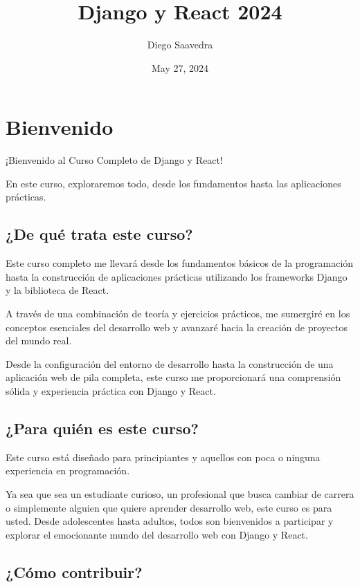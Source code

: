 \documentclass[
  a4paper,
  DIV=11,
  numbers=noendperiod,
  onepage,
  openany]{scrreprt}
\title{Django y React 2024}
\author{Diego Saavedra}
\date{May 27, 2024}
\renewcommand*\contentsname{Table of contents}
\newcommand\contentsname{Table of contents}
\begin{document}
\maketitle

\renewcommand*\contentsname{Table of contents}
{
\hypersetup{linkcolor=}
\setcounter{tocdepth}{2}
\tableofcontents
}

\chapter{Bienvenido}\label{bienvenido}

¡Bienvenido al Curso Completo de Django y React!

En este curso, exploraremos todo, desde los fundamentos hasta las
aplicaciones prácticas.

\section{¿De qué trata este curso?}\label{de-quuxe9-trata-este-curso}

Este curso completo me llevará desde los fundamentos básicos de la
programación hasta la construcción de aplicaciones prácticas utilizando
los frameworks Django y la biblioteca de React.

A través de una combinación de teoría y ejercicios prácticos, me
sumergiré en los conceptos esenciales del desarrollo web y avanzaré
hacia la creación de proyectos del mundo real.

Desde la configuración del entorno de desarrollo hasta la construcción
de una aplicación web de pila completa, este curso me proporcionará una
comprensión sólida y experiencia práctica con Django y React.

\section{¿Para quién es este curso?}\label{para-quiuxe9n-es-este-curso}

Este curso está diseñado para principiantes y aquellos con poca o
ninguna experiencia en programación.

Ya sea que sea un estudiante curioso, un profesional que busca cambiar
de carrera o simplemente alguien que quiere aprender desarrollo web,
este curso es para usted. Desde adolescentes hasta adultos, todos son
bienvenidos a participar y explorar el emocionante mundo del desarrollo
web con Django y React.

\section{¿Cómo contribuir?}\label{cuxf3mo-contribuir}
\end{document}
